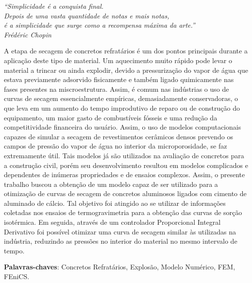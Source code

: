 \documentclass[
	12pt,				%
	openrany,			%
	oneside,			%
	a4paper,			%
	chapter=TITLE,		%
	english,			%
	french,				%
	spanish,			%
	brazil,				%
	hyphens,
  oldfontcommands]{abntex2}
\theoremstyle{definition}
\theoremstyle{definition}
\begin{document}
\begin{epigrafe}
    \vspace*{\fill}
	\begin{flushright}
		\textit{``Simplicidade é a conquista final.\\ Depois de uma vasta quantidade
      de notas e mais notas, \\ é a simplicidade que surge como a recompensa
      máxima da arte.''\\
		Frédéric Chopin}
	\end{flushright}
\end{epigrafe}


\begin{resumo}


 \vspace{\onelineskip}
    
 \noindent
 A etapa de secagem de concretos refratários é um dos pontos principais durante
 a aplicação deste tipo de material. Um aquecimento muito rápido pode levar o
 material a trincar ou ainda explodir, devido a pressurização do vapor de água
 que estava previamente adsorvido fisicamente e também ligado quimicamente nas
 fases presentes na miscroestrutura. Assim, é comum nas indústrias o uso de
 curvas de secagem essencialmente empíricas, demasiadamente conservadoras, o que
 leva em um aumento do tempo improdutivo de reparo ou de construção do
 equipamento, um maior gasto de combustíveis fósseis e uma redução da
 competitividade financeira do usuário. Assim, o uso de modelos computacionais
 capazes de simular a secagem de revestimentos cerâmicos densos prevendo os
 campos de pressão do vapor de água no interior da microporosidade, se faz
 extremamente útil. Tais modelos já são utilizados na avaliação de concretos
 para a construção civil, porém seu desenvolvimento resultou em modelos
 complicados e dependentes de inúmeras propriedades e de ensaios complexos.
 Assim, o presente trabalho buscou a obtenção de um modelo capaz de ser
 utilizado para a otimização de curvas de secagem de concretos aluminosos
 ligados com cimento de aluminado de cálcio. Tal objetivo foi atingido ao se
 utilizar de informações coletadas nos ensaios de termogravimetria para a
 obtenção das curvas de sorção isotérmica. Em seguida, através de um controlador
 Proporcional Integral Derivativo foi possível otimizar uma curva de secagem
 similar às utilizadas na indústria, reduzindo as pressões no interior do
 material no mesmo intervalo de tempo.
 
 \textbf{Palavras-chaves}: Concretos Refratários, Explosão, Modelo Numérico, FEM, FEniCS.
\end{resumo}
\end{document}

